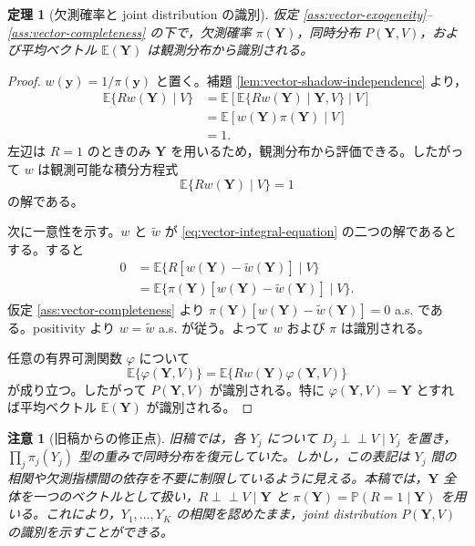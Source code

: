 \documentclass[dvipdfmx,autodetect-engine]{jsarticle}
\newtheorem{theorem}{定理}
\newtheorem{remark}{注意}
\newcommand{\indep}{\mathrel{\perp\!\!\!\perp}}
\newcommand{\E}{\mathbb{E}}
\newcommand{\Prb}{\mathbb{P}}
\newcommand{\1}{\mathbf{1}}
\newcommand{\Y}{\bm{Y}}
\begin{document}
\begin{theorem}[欠測確率と joint distribution の識別]
\label{thm:vector-shadow-identification}
仮定 \ref{ass:vector-exogeneity}--\ref{ass:vector-completeness} の下で，欠測確率 $\pi(\Y)$，同時分布 $P(\Y,V)$，および平均ベクトル $\E(\Y)$ は観測分布から識別される。
\end{theorem}

\begin{proof}
$w(\bm y)=1/\pi(\bm y)$ と置く。補題 \ref{lem:vector-shadow-independence} より，
\begin{align}
  \E\{Rw(\Y)\mid V\}
  &=\E\left[\E\{Rw(\Y)\mid \Y,V\}\mid V\right]\\
  &=\E\left[w(\Y)\pi(\Y)\mid V\right]\\
  &=1.
  \label{eq:vector-ipw-moment}
\end{align}
左辺は $R=1$ のときのみ $\Y$ を用いるため，観測分布から評価できる。したがって $w$ は観測可能な積分方程式
\begin{equation}
  \E\{Rw(\Y)\mid V\}=1
  \label{eq:vector-integral-equation}
\end{equation}
の解である。

次に一意性を示す。$w$ と $\widetilde w$ が \eqref{eq:vector-integral-equation} の二つの解であるとする。すると
\begin{align}
0
&=\E\{R[w(\Y)-\widetilde w(\Y)]\mid V\}\\
&=\E\{\pi(\Y)[w(\Y)-\widetilde w(\Y)]\mid V\}.
\end{align}
仮定 \ref{ass:vector-completeness} より $\pi(\Y)[w(\Y)-\widetilde w(\Y)]=0$ a.s. である。positivity より $w=\widetilde w$ a.s. が従う。よって $w$ および $\pi$ は識別される。

任意の有界可測関数 $\varphi$ について
\begin{equation}
  \E\{\varphi(\Y,V)\}
  =\E\{Rw(\Y)\varphi(\Y,V)\}
  \label{eq:vector-ipw-functional}
\end{equation}
が成り立つ。したがって $P(\Y,V)$ が識別される。特に $\varphi(\Y,V)=\Y$ とすれば平均ベクトル $\E(\Y)$ が識別される。
\end{proof}

\begin{remark}[旧稿からの修正点]
旧稿では，各 $Y_j$ について $D_j\indep V\mid Y_j$ を置き，$\prod_j\pi_j(Y_j)$ 型の重みで同時分布を復元していた。しかし，この表記は $Y_j$ 間の相関や欠測指標間の依存を不要に制限しているように見える。本稿では，$\Y$ 全体を一つのベクトルとして扱い，$R\indep V\mid \Y$ と $\pi(\Y)=\Prb(R=1\mid \Y)$ を用いる。これにより，$Y_1,\ldots,Y_K$ の相関を認めたまま，joint distribution $P(\Y,V)$ の識別を示すことができる。
\end{remark}
\end{document}
